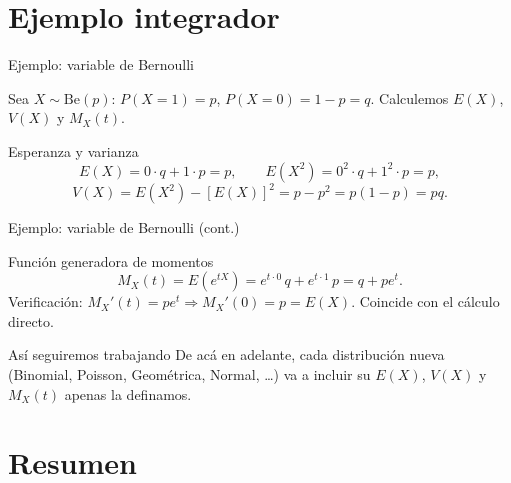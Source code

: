 \documentclass[aspectratio=169,11pt]{beamer}
\begin{document}
\section{Ejemplo integrador}

\begin{frame}{Ejemplo: variable de Bernoulli}
\begin{example}
Sea $X\sim\text{Be}(p)$: $P(X=1)=p$, $P(X=0)=1-p=q$. Calculemos $E(X)$, $V(X)$ y $M_X(t)$.
\end{example}

\begin{block}{Esperanza y varianza}
\[
E(X) = 0\cdot q + 1\cdot p = p, \qquad E(X^2) = 0^2\cdot q+1^2\cdot p = p,
\]
\[
V(X) = E(X^2)-[E(X)]^2 = p-p^2 = p(1-p) = pq.
\]
\end{block}
\end{frame}

\begin{frame}{Ejemplo: variable de Bernoulli (cont.)}
\begin{block}{Función generadora de momentos}
\[
M_X(t) = E(e^{tX}) = e^{t\cdot 0}\, q + e^{t\cdot 1}\, p = q + p e^t.
\]
Verificación: $M_X'(t) = pe^t \Rightarrow M_X'(0) = p = E(X)$. Coincide con el cálculo directo.
\end{block}

\begin{alertblock}{Así seguiremos trabajando}
De acá en adelante, cada distribución nueva (Binomial, Poisson, Geométrica, Normal, \dots) va a incluir su $E(X)$, $V(X)$ y $M_X(t)$ apenas la definamos.
\end{alertblock}
\end{frame}

\section{Resumen}
\end{document}
